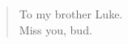 \vspace*{\fill}
\vspace*{-2in}
\begin{quote}
    \center
    To my brother Luke. \\
    Miss you, bud.
\end{quote}
\vspace*{\fill}
